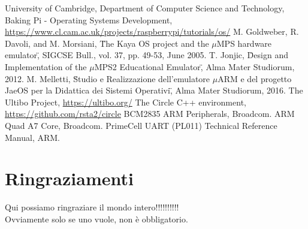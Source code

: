 \documentclass[12pt,a4paper,openright,twoside]{report}
\begin{document}
\begin{thebibliography}{90}             %
 University of Cambridge, Department of Computer Science and Technology,
                    Baking Pi - Operating Systems Development,
                    \url{https://www.cl.cam.ac.uk/projects/raspberrypi/tutorials/os/}
 M. Goldweber, R. Davoli, and M. Morsiani,
                        \"The Kaya OS project and the $\mu$MPS hardware emulator\",
                          SIGCSE Bull., vol. 37, pp. 49-53, June 2005.
 T. Jonjic,
                    \"Design and Implementation of the $\mu$MPS2 Educational Emulator\",
                    Alma Mater Studiorum, 2012.
 M. Melletti,
                    \"Studio e Realizzazione dell'emulatore $\mu$ARM e del progetto
                    JaeOS per la Didattica dei Sistemi Operativi\",
                    Alma Mater Studiorum, 2016.
 The Ultibo Project, \url{https://ultibo.org/}
 The Circle C++ environment, \url{https://github.com/rsta2/circle}
 BCM2835 ARM Peripherals, Broadcom.
 ARM Quad A7 Core, Broadcom.
 PrimeCell UART (PL011) Technical Reference Manual, ARM.
\end{thebibliography}
\clearpage{\pagestyle{empty}\cleardoublepage}
\chapter*{Ringraziamenti}
\thispagestyle{empty}
Qui possiamo ringraziare il mondo intero!!!!!!!!!!\\
Ovviamente solo se uno vuole, non \`e obbligatorio.
\end{document}
